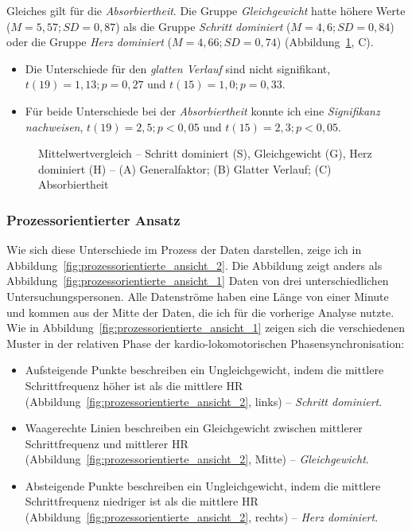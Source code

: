 Gleiches gilt für die \emph{Absorbiertheit}. Die Gruppe \emph{Gleichgewicht} hatte höhere Werte ($M = 5{,}57; SD = 0{,}87$) als die Gruppe \emph{Schritt dominiert} ($M = 4{,}6; SD = 0{,}84$) oder die Gruppe \emph{Herz dominiert} ($M = 4{,}66; SD = 0{,}74$) (Abbildung~\ref{fig:mittelwert_vergleich}, C).
\begin{itemize}
	
	\item Die Unterschiede für den \emph{glatten Verlauf} sind nicht signifikant, $t(19) = 1{,}13; p = 0{,}27$ und $t(15) = 1{,}0; p = 0{,}33$.
	
	\item Für beide Unterschiede bei der \emph{Absorbiertheit} konnte ich eine \emph{Signifikanz nachweisen}, $t(19) = 2{,}5; p < 0{,}05$ und $t(15) = 2{,}3; p < 0{,}05$.
\end{itemize}
\begin{figure}
	[thb!]  \caption[Mittelwertvergleich -- Schritt dominiert, Gleichgewicht, Herz dominiert]{Mittelwertvergleich -- Schritt dominiert (S), Gleichgewicht (G), Herz dominiert (H) -- (A) Generalfaktor; (B) Glatter Verlauf; (C) Absorbiertheit} \label{fig:mittelwert_vergleich} 
\end{figure}

\subsubsection{Prozessorientierter Ansatz} 

\label{ssub:prozessorientierter_ansatz_5_3}

Wie sich diese Unterschiede im Prozess der Daten darstellen, zeige ich in Abbildung~\ref{fig:prozessorientierte_ansicht_2}. Die Abbildung zeigt anders als Abbildung~\ref{fig:prozessorientierte_ansicht_1} Daten von drei unterschiedlichen Untersuchungspersonen. Alle Datenströme haben eine Länge von einer Minute und kommen aus der Mitte der Daten, die ich für die vorherige Analyse nutzte. Wie in Abbildung~\ref{fig:prozessorientierte_ansicht_1} zeigen sich die verschiedenen Muster in der relativen Phase der kardio-lokomotorischen Phasensynchronisation: 
\begin{itemize}
	
	\item Aufsteigende Punkte beschreiben ein Ungleichgewicht, indem die mittlere Schrittfrequenz höher ist als die mittlere \ac{HR} (Abbildung~\ref{fig:prozessorientierte_ansicht_2}, links) -- \emph{Schritt dominiert}.
	
	\item Waagerechte Linien beschreiben ein Gleichgewicht zwischen mittlerer Schrittfrequenz und mittlerer \ac{HR} (Abbildung~\ref{fig:prozessorientierte_ansicht_2}, Mitte) -- \emph{Gleichgewicht}.
	
	\item Absteigende Punkte beschreiben ein Ungleichgewicht, indem die mittlere Schrittfrequenz niedriger ist als die mittlere \ac{HR} (Abbildung~\ref{fig:prozessorientierte_ansicht_2}, rechts) -- \emph{Herz dominiert}. 
\end{itemize}

